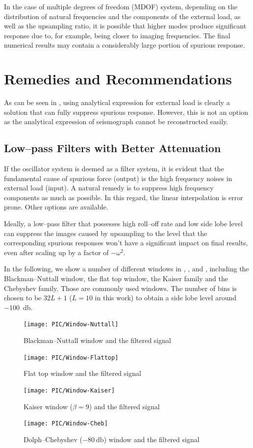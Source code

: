 In the case of multiple degrees of freedom (MDOF) system, depending on the distribution of natural frequencies and the components of the external load, as well as the upsampling ratio, it is possible that higher modes produce significant response due to, for example, being closer to imaging frequencies. The final numerical results may contain a considerably large portion of spurious response.
\section{Remedies and Recommendations}
As can be seen in , using analytical expression for external load is clearly a solution that can fully suppress spurious response. However, this is not an option as the analytical expression of seismograph cannot be reconstructed easily.
\subsection{Low--pass Filters with Better Attenuation}
If the oscillator system is deemed as a filter system, it is evident that the fundamental cause of spurious force (output) is the high frequency noises in external load (input). A natural remedy is to suppress high frequency components as much as possible. In this regard, the linear interpolation is error prone. Other options are available.

Ideally, a low--pass filter that possesses high roll--off rate and low side lobe level can suppress the images caused by upsampling to the level that the corresponding spurious responses won't have a significant impact on final results, even after scaling up by a factor of $-\omega^2$.

In the following, we show a number of different windows in , ,  and , including the Blackman--Nuttall window, the flat top window, the Kaiser family and the Chebyshev family. Those are commonly used windows. The number of bins is chosen to be $32L+1$ ($L=10$ in this work) to obtain a side lobe level around \SI{-100}{\decibel}.
\begin{figure}[htb!]
\centering
\texttt{[image: PIC/Window-Nuttall]}
\caption{Blackman--Nuttall window and the filtered signal}\label{fig:nuttall_window}
\end{figure}
\begin{figure}[htb!]
\centering
\texttt{[image: PIC/Window-Flattop]}
\caption{Flat top window and the filtered signal}\label{fig:flattop_window}
\end{figure}
\begin{figure}[htb!]
\centering
\texttt{[image: PIC/Window-Kaiser]}
\caption{Kaiser window ($\beta=9$) and the filtered signal}\label{fig:kaiser_window}
\end{figure}
\begin{figure}[htb!]
\centering
\texttt{[image: PIC/Window-Cheb]}
\caption{Dolph--Chebyshev ($\SI{-80}{\decibel}$) window and the filtered signal}\label{fig:cheb_window}
\end{figure}


